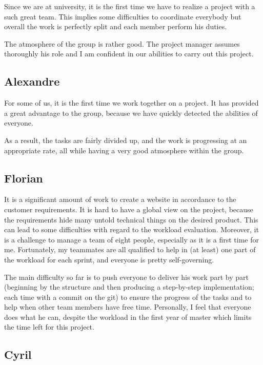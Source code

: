 Since we are at university, it is the first time we have to realize a project with a such great team. This implies some difficulties to coordinate everybody but overall the work is perfectly split and each member perform his duties. \newline

The atmosphere of the group is rather good. The project manager assumes thoroughly his role and I am confident in our abilities to carry out this project.
\subsection{Alexandre}

For some of us, it is the first time we work together on a project. It has provided a great advantage to the group, because we have quickly detected the abilities of everyone. \newline

As a result, the tasks are fairly divided up, and the work is progressing at an appropriate rate, all while having a very good atmosphere within the group.

\subsection{Florian}
It is a significant amount of work to create a website in accordance to the customer requirements. It is hard to have a global view on the project, because the requirements hide many untold technical things on the desired product. This can lead to some difficulties with regard to the workload evaluation. Moreover, it is a challenge to manage a team of eight people, especially as it is a first time for me. Fortunately, my
teammates are all qualified to help in (at least) one part of the workload for
each sprint, and everyone is pretty self-governing. \newline

The main difficulty so far is to push everyone to deliver his work part by
part (beginning by the structure and then producing a step-by-step
implementation; each time with a commit on the git) to ensure the progress
of the tasks and to help when other team members have free time.
Personally, I feel that everyone does what he can, despite the workload in
the first year of master which limits the time left for this project.\newline
\subsection{Cyril}

